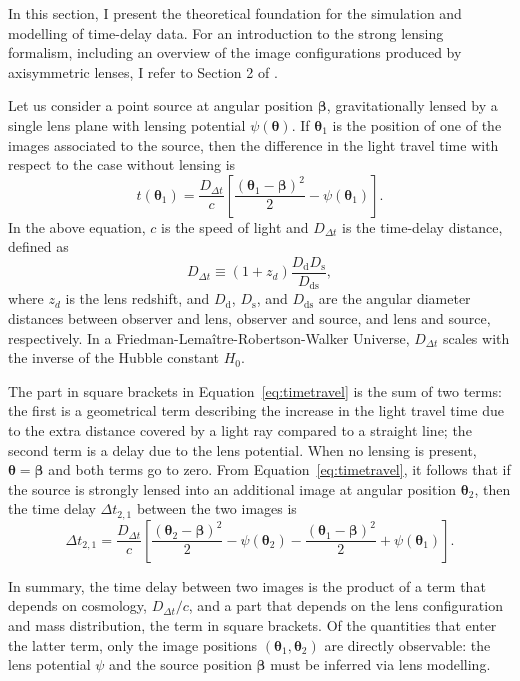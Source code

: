 \documentclass{aa}
\def\ddt{D_{\Delta t}}
\def\Eref#1{Equation~\ref{#1}\xspace}
\begin{document}
In this section, I present the theoretical foundation for the simulation and modelling of time-delay data. For an introduction to the strong lensing formalism, including an overview of the image configurations produced by axisymmetric lenses, I refer to Section 2 of .

Let us consider a point source at angular position $\boldsymbol\beta$, gravitationally lensed by a single lens plane with lensing potential $\psi(\boldsymbol\theta)$. 
If $\boldsymbol\theta_1$ is the position of one of the images associated to the source, then the difference in the light travel time with respect to the case without lensing is
\begin{equation}\label{eq:timetravel}
t(\boldsymbol\theta_1) = \frac{\ddt}{c}\left[\frac{(\boldsymbol\theta_1 - \boldsymbol\beta)^2}{2} - \psi(\boldsymbol\theta_1)\right].
\end{equation}
In the above equation, $c$ is the speed of light and $\ddt$ is the time-delay distance, defined as
\begin{equation}
\ddt \equiv (1+z_d)\frac{D_\mathrm{d} D_\mathrm{s}}{D_\mathrm{ds}},
\end{equation}
where $z_d$ is the lens redshift, and $D_{\mathrm{d}}$, $D_{\mathrm{s}}$, and $D_{\mathrm{ds}}$ are the angular diameter distances between observer and lens, observer and source, and lens and source, respectively.
In a Friedman-Lema\^{i}tre-Robertson-Walker Universe, $\ddt$ scales with the inverse of the Hubble constant $H_0$.

The part in square brackets in \Eref{eq:timetravel} is the sum of two terms: the first is a geometrical term describing the increase in the light travel time due to the extra distance covered by a light ray compared to a straight line; the second term is a delay due to the lens potential.
When no lensing is present, $\boldsymbol\theta = \boldsymbol\beta$ and both terms go to zero.
From \Eref{eq:timetravel}, it follows that if the source is strongly lensed into an additional image at angular position $\boldsymbol\theta_2$, then the time delay $\Delta t_{2,1}$ between the two images is
\begin{equation}\label{eq:timedelay}
\Delta t_{2,1} = \frac{\ddt}{c}\left[\frac{(\boldsymbol\theta_2 - \boldsymbol\beta)^2}{2} - \psi(\boldsymbol\theta_2) - \frac{(\boldsymbol\theta_1 - \boldsymbol\beta)^2}{2} + \psi(\boldsymbol\theta_1)\right].
\end{equation}

In summary, the time delay between two images is the product of a term that depends on cosmology, $\ddt/c$, and a part that depends on the lens configuration and mass distribution, the term in square brackets. Of the quantities that enter the latter term, only the image positions $(\boldsymbol\theta_1,\boldsymbol\theta_2)$ are directly observable: the lens potential $\psi$ and the source position $\boldsymbol\beta$ must be inferred via lens modelling.
\end{document}
